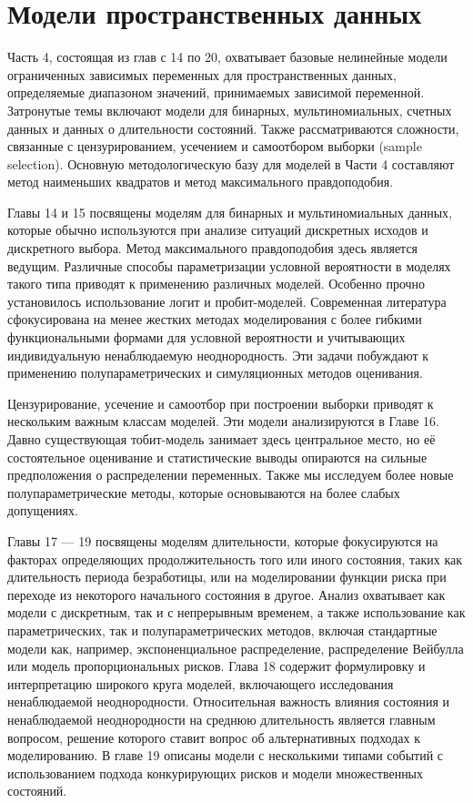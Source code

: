
\part{Модели пространственных данных}

Часть 4, состоящая из глав с 14 по 20, охватывает базовые нелинейные модели ограниченных зависимых переменных для пространственных данных,  определяемые диапазоном значений,  принимаемых зависимой переменной. Затронутые темы включают модели для бинарных, мультиномиальных, счетных данных и данных о длительности состояний. Также рассматриваются сложности, связанные с цензурированием, усечением и самоотбором выборки (sample selection). Основную методологическую базу для моделей в Части 4 составляют метод наименьших квадратов и метод максимального правдоподобия.

Главы 14 и 15 посвящены моделям для бинарных и мультиномиальных данных,  которые обычно используются при анализе ситуаций дискретных исходов и дискретного выбора. Метод максимального правдоподобия здесь является ведущим. Различные способы параметризации условной вероятности в моделях такого типа приводят к применению различных моделей. Особенно прочно установилось использование логит и пробит-моделей. Современная литература сфокусирована на менее жестких методах моделирования с более гибкими функциональными формами для условной вероятности и учитывающих индивидуальную ненаблюдаемую неоднородность. Эти задачи побуждают к применению полупараметрических  и симуляционных  методов оценивания.

Цензурирование,  усечение и самоотбор при построении выборки приводят к  нескольким важным классам моделей. Эти модели анализируются в Главе 16. Давно существующая тобит-модель занимает здесь центральное  место,  но её состоятельное оценивание и статистические выводы опираются на сильные  предположения о распределении переменных. Также мы исследуем более новые полупараметрические методы,  которые основываются на более слабых допущениях.

Главы  17 --- 19 посвящены моделям длительности, которые фокусируются на факторах определяющих  продолжительность того или иного состояния,  таких как длительность периода безработицы,  или на моделировании функции риска при переходе из некоторого начального состояния в другое. Анализ охватывает как модели с дискретным,  так и с непрерывным временем,  а также использование как параметрических,  так и полупараметрических методов,  включая стандартные модели как,  например,  экспоненциальное распределение,  распределение Вейбулла или модель пропорциональных рисков. Глава 18 содержит формулировку и интерпретацию широкого круга моделей,  включающего исследования ненаблюдаемой неоднородности. Относительная важность влияния состояния и ненаблюдаемой неоднородности на среднюю длительность является главным вопросом,  решение которого ставит вопрос об альтернативных подходах к моделированию. В главе 19 описаны модели с несколькими типами событий с использованием подхода конкурирующих рисков и модели множественных состояний.

